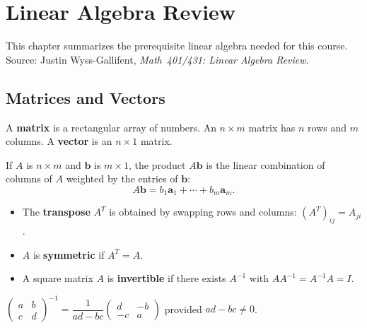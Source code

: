 \chapter{Linear Algebra Review}

This chapter summarizes the prerequisite linear algebra needed for this course.
Source: Justin Wyss-Gallifent, \textit{Math~401/431: Linear Algebra Review}.

\section{Matrices and Vectors}

\begin{definition}[Matrix]
A \textbf{matrix} is a rectangular array of numbers. An $n\times m$ matrix has $n$ rows and $m$ columns. A \textbf{vector} is an $n\times 1$ matrix.
\end{definition}

\begin{definition}
If $A$ is $n\times m$ and $\mathbf{b}$ is $m\times 1$, the product $A\mathbf{b}$ is the linear combination of columns of $A$ weighted by the entries of $\mathbf{b}$:
\[
  A\mathbf{b} = b_1\mathbf{a}_1 + \cdots + b_m\mathbf{a}_m.
\]
\end{definition}

\begin{definition}
\mbox{}
\begin{itemize}
  \item The \textbf{transpose} $A^T$ is obtained by swapping rows and columns: $(A^T)_{ij} = A_{ji}$.
  \item $A$ is \textbf{symmetric} if $A^T = A$.
  \item A square matrix $A$ is \textbf{invertible} if there exists $A^{-1}$ with $AA^{-1} = A^{-1}A = I$.
\end{itemize}
\end{definition}

\begin{theorem}
$\begin{pmatrix}a&b\\c&d\end{pmatrix}^{-1} = \dfrac{1}{ad-bc}\begin{pmatrix}d&-b\\-c&a\end{pmatrix}$
provided $ad-bc\neq 0$.
\end{theorem}

